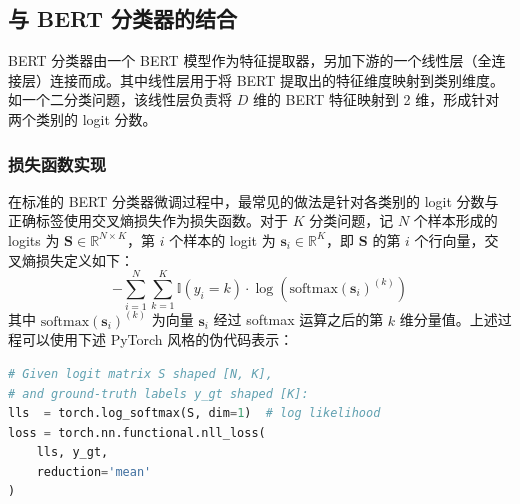 \documentclass[12pt, a4paper, UTF8]{ctexart}
\begin{document}
\subsection{与 BERT 分类器的结合}

BERT 分类器由一个 BERT 模型作为特征提取器，另加下游的一个线性层（全连接层）连接而成。其中线性层用于将 BERT 提取出的特征维度映射到类别维度。如一个二分类问题，该线性层负责将 $D$ 维的 BERT 特征映射到 2 维，形成针对两个类别的 logit 分数。

\subsubsection{损失函数实现}
\label{sec:adab-bert-loss}

在标准的 BERT 分类器微调过程中，最常见的做法是针对各类别的 logit 分数与正确标签使用交叉熵损失作为损失函数。对于 $K$ 分类问题，记 $N$ 个样本形成的 logits 为 $\mathbf{S} \in \mathbb{R}^{N\times K}$，第 $i$ 个样本的 logit 为 $\boldsymbol{s}_{i} \in \mathbb{R}^{K}$，即 $\mathbf{S}$ 的第 $i$ 个行向量，交叉熵损失定义如下：
$$
- \sum_{i=1}^{N} \sum_{k=1}^{K} \mathbb{I}(y_{i}=k) \cdot \log (\mathrm{softmax}(\boldsymbol{s}_{i})^{(k)})
$$
其中 $\mathrm{softmax}(\boldsymbol{s}_{i})^{(k)}$ 为向量 $\boldsymbol{s}_{i}$ 经过 softmax 运算之后的第 $k$ 维分量值。上述过程可以使用下述 PyTorch 风格的伪代码表示：


\begin{small}
\begin{lstlisting}[language=Python]
# Given logit matrix S shaped [N, K],
# and ground-truth labels y_gt shaped [K]:
lls  = torch.log_softmax(S, dim=1)  # log likelihood
loss = torch.nn.functional.nll_loss(
    lls, y_gt,
    reduction='mean'
)
\end{lstlisting}
\end{small}
\end{document}
